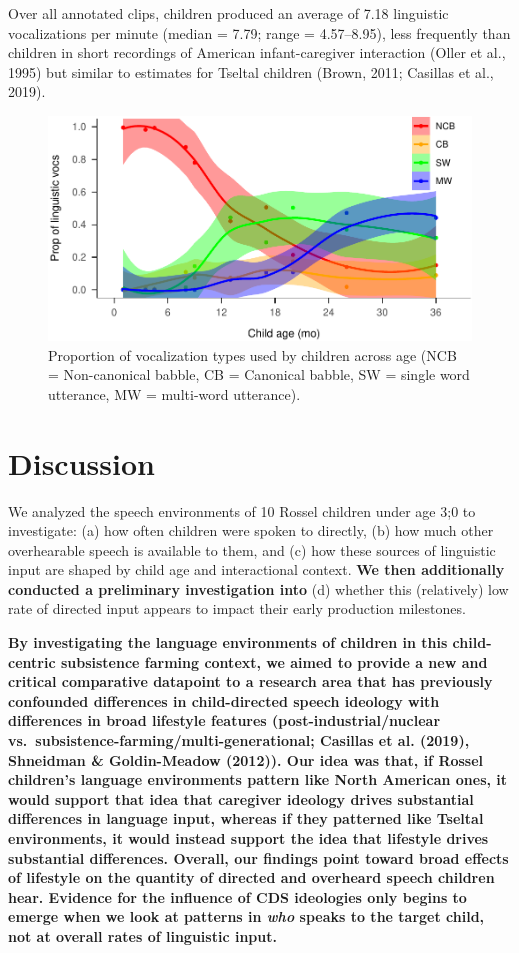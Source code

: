 \documentclass[,man,floatsintext]{apa6}
\begin{document}
Over all annotated clips, children produced an average of 7.18
linguistic vocalizations per minute (median = 7.79; range = 4.57--8.95),
less frequently than children in short recordings of American
infant-caregiver interaction (Oller et al., 1995) but similar to
estimates for Tseltal children (Brown, 2011; Casillas et al., 2019).

\begin{figure}
\centering
\includegraphics{Yeli-CLE_files/figure-latex/fig4-1.pdf}
\caption{\label{fig:fig4}Proportion of vocalization types used by children
across age (NCB = Non-canonical babble, CB = Canonical babble, SW =
single word utterance, MW = multi-word utterance).}
\end{figure}

\section{Discussion}\label{disc}

We analyzed the speech environments of 10 Rossel children under age 3;0
to investigate: (a) how often children were spoken to directly, (b) how
much other overhearable speech is available to them, and (c) how these
sources of linguistic input are shaped by child age and interactional
context. \textbf{We then additionally conducted a preliminary
investigation into} (d) whether this (relatively) low rate of directed
input appears to impact their early production milestones.

\textbf{By investigating the language environments of children in this
child-centric subsistence farming context, we aimed to provide a new and
critical comparative datapoint to a research area that has previously
confounded differences in child-directed speech ideology with
differences in broad lifestyle features (post-industrial/nuclear
vs.~subsistence-farming/multi-generational; Casillas et al. (2019),
Shneidman \& Goldin-Meadow (2012)). Our idea was that, if Rossel
children's language environments pattern like North American ones, it
would support that idea that caregiver ideology drives substantial
differences in language input, whereas if they patterned like Tseltal
environments, it would instead support the idea that lifestyle drives
substantial differences. Overall, our findings point toward broad
effects of lifestyle on the quantity of directed and overheard speech
children hear. Evidence for the influence of CDS ideologies only begins
to emerge when we look at patterns in \emph{who} speaks to the target
child, not at overall rates of linguistic input.}
\end{document}
